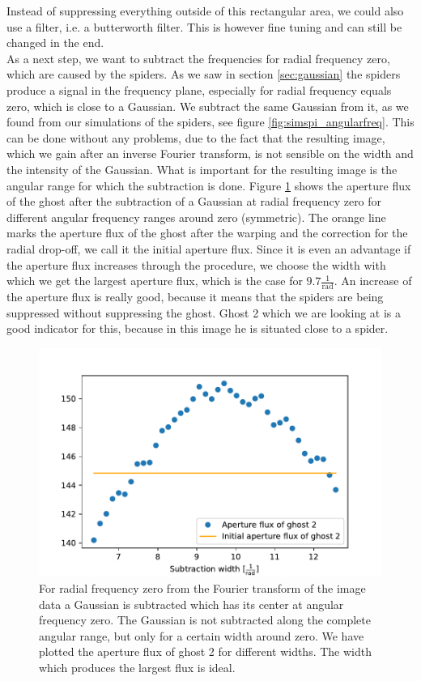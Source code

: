 Instead of suppressing everything outside of this rectangular area, we could also use a filter, i.e. a butterworth filter. This is however fine tuning and can still be changed in the end.\\
As a next step, we want to subtract the frequencies for radial frequency zero, which are caused by the spiders. As we saw in section \ref{sec:gaussian} the spiders produce a signal in the frequency plane, especially for radial frequency equals zero, which is close to a Gaussian. We subtract the same Gaussian from it, as we found from our simulations of the spiders, see figure \ref{fig:simspi_angularfreq}. This can be done without any problems, due to the fact that the resulting image, which we gain after an inverse Fourier transform, is not sensible on the width and the intensity of the Gaussian. What is important for the resulting image is the angular range for which the subtraction is done. Figure \ref{fig:rad0_diffsubwidths} shows the aperture flux of the ghost after the subtraction of a Gaussian at radial frequency zero for different angular frequency ranges around zero (symmetric). The orange line marks the aperture flux of the ghost after the warping and the correction for the radial drop-off, we call it the initial aperture flux. Since it is even an advantage if the aperture flux increases through the procedure, we choose the width with which we get the largest aperture flux, which is the case for $9.7 \frac{1}{\mathrm{rad}}$. An increase of the aperture flux is really good, because it means that the spiders are being suppressed without suppressing the ghost. Ghost 2 which we are looking at is a good indicator for this, because in this image he is situated close to a spider.
\begin{figure}[H]
	\centering
		\includegraphics[width=1.0\textwidth]{pics/rad0_diffsubwidths.pdf}
		\caption{For radial frequency zero from the Fourier transform of the image data a Gaussian is subtracted which has its center at angular frequency zero. The Gaussian is not subtracted along the complete angular range, but only for a certain width around zero. We have plotted the aperture flux of ghost 2 for different widths. The width which produces the largest flux is ideal.}
		\label{fig:rad0_diffsubwidths}
\end{figure}

